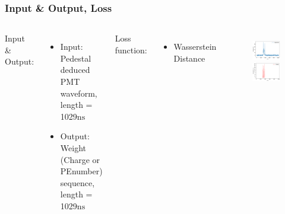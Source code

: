 \documentclass[handout]{beamer}
\begin{document}
\begin{frame}
\frametitle{Input \& Output, Loss}
\begin{columns}
\hspace{4mm}Input \& Output:
\begin{itemize}
    \item Input: Pedestal deduced PMT waveform, length = 1029$\mathrm{ns}$
    \item Output: Weight (Charge or PEnumber) sequence, length = 1029$\mathrm{ns}$
\end{itemize}
\hspace{4mm}Loss function:
\begin{itemize}
    \item Wasserstein Distance
\end{itemize}
\setlength{\abovecaptionskip}{-2mm}
\setlength{\belowcaptionskip}{0mm}
\begin{figure}
    \centering
    \includegraphics[width=0.9\linewidth]{img/wave.png}
    \includegraphics[width=0.9\linewidth]{img/charge.png}
\end{figure}
\end{columns}
\end{frame}
\end{document}
